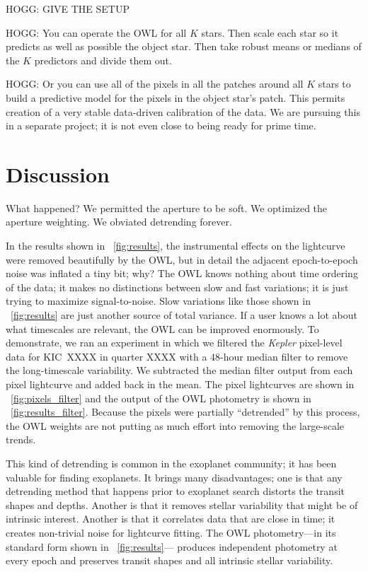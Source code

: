 \documentclass[12pt, letterpaper, preprint]{aastex}
\newcommand{\project}[1]{\textsl{#1}}
\begin{document}
HOGG:  GIVE THE SETUP

HOGG:  You can operate the OWL for all $K$ stars.
Then scale each star so it predicts as well as possible the object star.
Then take robust means or medians of the $K$ predictors and divide them out.

HOGG:  Or you can use all of the pixels in all the patches around all $K$ stars
  to build a predictive model for the pixels in the object star's patch.
This permits creation of a very stable data-driven calibration of the data.
We are pursuing this in a separate project;
  it is not even close to being ready for prime time.

\section{Discussion}

What happened?
We permitted the aperture to be soft.
We optimized the aperture weighting.
We obviated detrending forever.

In the results shown in \figurename~\ref{fig:results},
  the instrumental effects on the lightcurve were removed beautifully by the OWL,
  but in detail
  the adjacent epoch-to-epoch noise was inflated a tiny bit;
  why?
The OWL knows nothing about time ordering of the data;
  it makes no distinctions between slow and fast variations;
  it is just trying to maximize signal-to-noise.
Slow variations like those shown in \figurename~\ref{fig:results}
  are just another source of total variance.
If a user knows a lot about what timescales are relevant,
  the OWL can be improved enormously.
To demonstrate, we ran an experiment in which we filtered the \project{Kepler} pixel-level data
  for KIC~XXXX in quarter XXXX
  with a 48-hour median filter to remove the long-timescale variability.
We subtracted the median filter output from each pixel lightcurve and added back in the mean.
The pixel lightcurves are shown in \figurename~\ref{fig:pixels_filter}
  and the output of the OWL photometry is shown in \figurename~\ref{fig:results_filter}.
Because the pixels were partially ``detrended'' by this process,
  the OWL weights are not putting as much effort into removing the large-scale trends.

This kind of detrending is common in the exoplanet community;
  it has been valuable for finding exoplanets.
It brings many disadvantages;
  one is that any detrending method that happens prior to exoplanet search
  distorts the transit shapes and depths.
Another is that it removes stellar variability that might be of intrinsic interest.
Another is that it correlates data that are close in time;
  it creates non-trivial noise for lightcurve fitting.
The OWL photometry---in its standard form shown in \figurename~\ref{fig:results}---%
  produces independent photometry at every epoch
  and preserves transit shapes and all intrinsic stellar variability.
\end{document}

